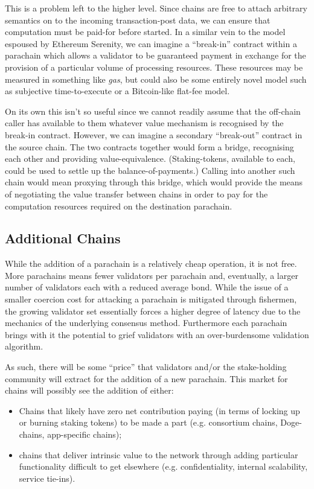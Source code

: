 \documentclass[usepdftitle=false]{beamer}
\makeatletter
\newcommand*\eg{e.g.\@\xspace}
\makeatother
\begin{document}
\begin{frame}
This is a problem left to the higher level. Since chains are free to attach arbitrary semantics on to the incoming transaction-post data, we can ensure that computation must be paid-for before started. In a similar vein to the model espoused by Ethereum Serenity, we can imagine a ``break-in'' contract within a parachain which allows a validator to be guaranteed payment in exchange for the provision of a particular volume of processing resources. These resources may be measured in something like \textit{gas}, but could also be some entirely novel model such as subjective time-to-execute or a Bitcoin-like flat-fee model.

 On its own this isn't so useful since we cannot readily assume that the off-chain caller has available to them whatever value mechanism is recognised by the break-in contract. However, we can imagine a secondary ``break-out'' contract in the source chain. The two contracts together would form a bridge, recognising each other and providing value-equivalence. (Staking-tokens, available to each, could be used to settle up the balance-of-payments.) Calling into another such chain would mean proxying through this bridge, which would provide the means of negotiating the value transfer between chains in order to pay for the computation resources required on the destination parachain.

\subsection{Additional Chains}
\label{additional-chains}

 While the addition of a parachain is a relatively cheap operation, it is not free. More parachains means fewer validators per parachain and, eventually, a larger number of validators each with a reduced average bond. While the issue of a smaller coercion cost for attacking a parachain is mitigated through fishermen, the growing validator set essentially forces a higher degree of latency due to the mechanics of the underlying consensus method. Furthermore each parachain brings with it the potential to grief validators with an over-burdensome validation algorithm.

 As such, there will be some ``price'' that validators and/or the stake-holding community will extract for the addition of a new parachain. This market for chains will possibly see the addition of either:

\begin{itemize}
\item Chains that likely have zero net contribution paying (in terms of locking up or burning staking tokens) to be made a part (\eg consortium chains, Doge-chains, app-specific chains);
\item chains that deliver intrinsic value to the network through adding particular functionality difficult to get elsewhere (\eg confidentiality, internal scalability, service tie-ins).
\end{itemize}


\end{frame}
\end{document}
